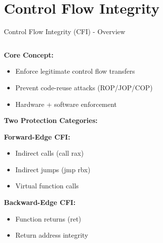 \documentclass[aspectratio=169,12pt]{beamer}
\begin{document}
\section{Control Flow Integrity}

\begin{frame}{Control Flow Integrity (CFI) - Overview}
    \begin{columns}
        \begin{column}{0.5\textwidth}
            \textbf{Core Concept:}
            \begin{itemize}
                \item Enforce legitimate control flow transfers
                \item Prevent code-reuse attacks (ROP/JOP/COP)
                \item Hardware + software enforcement
            \end{itemize}
            
            \vspace{0.3cm}
            \textbf{Two Protection Categories:}
            
            \colorbox{green!20}{\textbf{Forward-Edge CFI:}}
            \begin{itemize}
                \item Indirect calls (call rax)
                \item Indirect jumps (jmp rbx)
                \item Virtual function calls
            \end{itemize}
            
            \colorbox{blue!20}{\textbf{Backward-Edge CFI:}}
            \begin{itemize}
                \item Function returns (ret)
                \item Return address integrity
            \end{itemize}
        \end{column}
        \begin{column}{0.5\textwidth}
\end{column}
\end{columns}
\end{frame}
\end{document}
